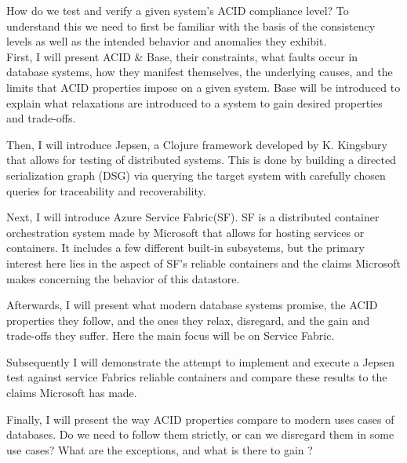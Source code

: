 \documentclass[a4paper,10pt,titlepage]{report}
\begin{document}
\vspace{5mm}
How do we test and verify a given system's ACID compliance level? To understand this we need to first be familiar with the basis of the consistency levels as well as the intended behavior and anomalies they exhibit.\\


First, I will present ACID \& Base, their constraints, what faults occur in database systems, how they manifest themselves, the underlying causes, and the limits that ACID properties impose on a given system. Base will be introduced to explain what relaxations are introduced to a system to gain desired properties and trade-offs.\\
\vspace{5mm}

Then, I will introduce Jepsen, a Clojure framework\cite{jepsonio} developed by K. Kingsbury that allows for testing of distributed systems. This is done by building a directed serialization graph (DSG) via querying the target system with carefully chosen queries for traceability and recoverability.  \\
\vspace{5mm}

Next, I will introduce Azure Service Fabric(SF). SF is a distributed container orchestration system made by Microsoft that allows for hosting services or containers. It includes a few different built-in subsystems, but the primary interest here lies in the aspect of SF's reliable containers and the claims Microsoft makes concerning the behavior of this datastore.\\
\vspace{5mm}

Afterwards, I will present what modern database systems promise, the ACID properties they follow, and the ones they relax, disregard, and the gain and trade-offs they suffer. Here the main focus will be on Service Fabric.\\
\vspace{5mm}

Subsequently  I will demonstrate  the attempt to implement and execute a Jepsen test against service Fabrics reliable containers and compare these results to the claims Microsoft has made.\\
\vspace{5mm}

Finally, I will present the way ACID properties compare to modern uses cases of databases. Do we need to follow them strictly, or can we disregard them in some use cases? What are the exceptions, and what is there to gain ?\\
\end{document}

